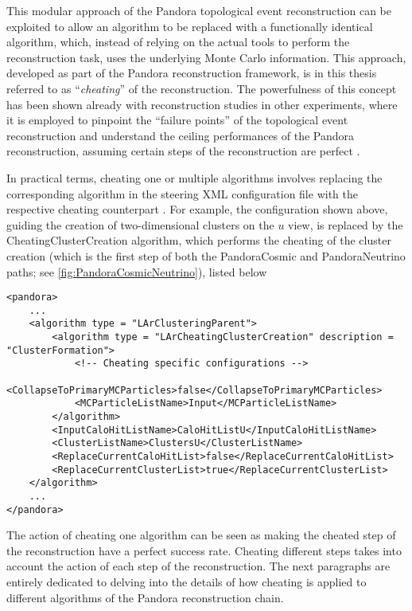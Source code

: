 This modular approach of the Pandora topological event reconstruction can be exploited to allow an algorithm to be replaced with a functionally identical algorithm, which, instead of relying on the actual tools to perform the reconstruction task, uses the underlying Monte Carlo information. This approach, developed as part of the Pandora reconstruction framework, is in this thesis referred to as ``\emph{cheating}'' of the reconstruction. The powerfulness of this concept has been shown already with reconstruction studies in other experiments, where it is employed to pinpoint the ``failure points'' of the topological event reconstruction and understand the ceiling performances of the Pandora reconstruction, assuming certain steps of the reconstruction are perfect \cite{Mawby:2023nws, Mawby:2025_FCCee, Nguyen:2023_cheatingPandora}. 

In practical terms, cheating one or multiple algorithms involves replacing the corresponding algorithm in the steering XML configuration file with the respective cheating counterpart \cite{Nguyen:2023_cheatingPandora}. For example, the configuration shown above, guiding the creation of two-dimensional clusters on the $u$ view, is replaced by the CheatingClusterCreation algorithm, which performs the cheating of the cluster creation (which is the first step of both the PandoraCosmic and PandoraNeutrino paths; see \autoref{fig:PandoraCosmicNeutrino}), listed below 

\begin{lstlisting}[style=xmlstyle]
<pandora>
    ...
    <algorithm type = "LArClusteringParent">
        <algorithm type = "LArCheatingClusterCreation" description = "ClusterFormation">
            <!-- Cheating specific configurations -->
            <CollapseToPrimaryMCParticles>false</CollapseToPrimaryMCParticles>
            <MCParticleListName>Input</MCParticleListName>
        </algorithm>
        <InputCaloHitListName>CaloHitListU</InputCaloHitListName>
        <ClusterListName>ClustersU</ClusterListName>
        <ReplaceCurrentCaloHitList>false</ReplaceCurrentCaloHitList>
        <ReplaceCurrentClusterList>true</ReplaceCurrentClusterList>
    </algorithm>
    ...
</pandora>
\end{lstlisting}

The action of cheating one algorithm can be seen as making the cheated step of the reconstruction have a perfect success rate. Cheating different steps takes into account the action of each step of the reconstruction. The next paragraphs are entirely dedicated to delving into the details of how cheating is applied to different algorithms of the Pandora reconstruction chain. 

